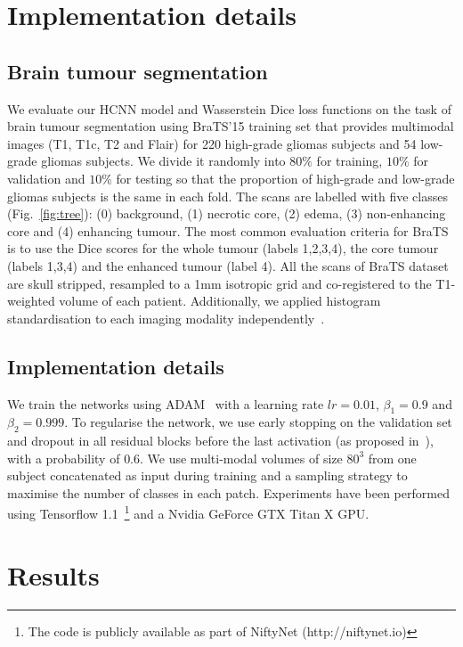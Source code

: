\documentclass[runningheads,orivec,a4paper]{llncs}
\begin{document}
\section{Implementation details}

\subsection{Brain tumour segmentation}
We evaluate our HCNN model and Wasserstein Dice loss functions on the
task of brain tumour segmentation using BraTS'15 training set that
provides multimodal images (T1, T1c, T2 and Flair) for 220 high-grade
gliomas subjects and 54 low-grade gliomas subjects.  We divide it
randomly into $80\%$ for training, $10\%$ for validation and $10\%$
for testing so that the proportion of high-grade and low-grade gliomas
subjects is the same in each fold. 
%
The scans are labelled with five classes (Fig.~\ref{fig:tree}): (0)
background, (1) necrotic core, (2) edema, (3) non-enhancing core and
(4) enhancing tumour. The most common evaluation criteria for BraTS is
to use the Dice scores for the whole tumour (labels 1,2,3,4), the core
tumour (labels 1,3,4) and the enhanced tumour (label 4). 
All the scans of BraTS dataset are skull stripped,
resampled to a 1mm isotropic grid and co-registered to the T1-weighted volume of each patient. 
%
Additionally, we applied histogram standardisation to each
imaging modality independently~\cite{histStd}.

\subsection{Implementation details}
We train the networks using ADAM~\cite{adam} with a
learning rate $lr=0.01$, $\beta_1 = 0.9$ and $\beta_2 = 0.999$. To
regularise the network, we use early stopping on the validation set
and dropout in all residual blocks before the last activation (as
proposed in~\cite{wideresnet}), with a probability of $0.6$. 
%
We use multi-modal volumes of size $80^3$ from one
subject concatenated as input during training and a
sampling strategy to maximise the number of
classes in each patch. 
%
Experiments have been performed using Tensorflow
1.1~\footnote{The code is publicly available as part of
  NiftyNet (http://niftynet.io)} and a Nvidia GeForce GTX Titan X GPU.



\section{Results}
\end{document}
